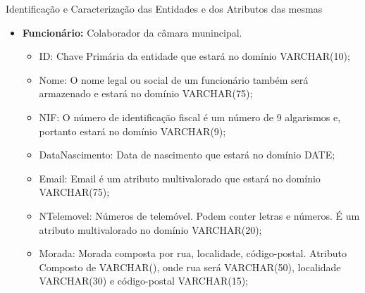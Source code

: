 \documentclass[compress,svgnames,handout,13.7pt]{beamer}
\begin{document}
\begin{frame}{Identificação e Caracterização das Entidades e dos Atributos das mesmas}
\begin{itemize}
                 \item{\textbf{Funcionário:}} Colaborador da câmara munincipal.
                     \begin{itemize}
                     \item{ID:} Chave Primária da entidade que estará no domínio VARCHAR(10);
                     \item{Nome:} O nome legal ou social de um funcionário também será armazenado e estará
                       no domínio VARCHAR(75);
                     \item{NIF:} O número de identificação fiscal é um número de 9 algarismos e, portanto estará
                       no domínio VARCHAR(9);
                     \item{DataNascimento:} Data de nascimento que estará no domínio DATE;
                       
                     \item{Email:} Email é um atributo multivalorado que estará no domínio VARCHAR(75);
                       
                     \item{NTelemovel:} Números de telemóvel. Podem conter letras e números. É um atributo multivalorado no domínio VARCHAR(20);
                       
                     \item{Morada:} Morada composta por rua, localidade, código-postal. Atributo Composto de VARCHAR(), onde rua será VARCHAR(50), localidade VARCHAR(30) e código-postal VARCHAR(15);
                       
                     \end{itemize}
\end{itemize}
\end{frame}
\end{document}
